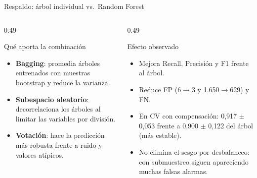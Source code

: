 \documentclass[aspectratio=169,11pt]{beamer}
\begin{document}
\begin{frame}{Respaldo: árbol individual vs.\ Random Forest}
  \scriptsize
  \setlength{\tabcolsep}{3pt}
  \renewcommand{\arraystretch}{1.15}
  \vspace{0.15cm}
  \begin{columns}[T]
    \begin{column}{0.49\textwidth}
      \begin{block}{Qué aporta la combinación}
        \scriptsize
        \begin{itemize}
          \item \textbf{Bagging}: promedia árboles entrenados con
                muestras bootstrap y reduce la varianza.
          \item \textbf{Subespacio aleatorio}: decorrelaciona los
                árboles al limitar las variables por división.
          \item \textbf{Votación}: hace la predicción más robusta
                frente a ruido y valores atípicos.
        \end{itemize}
      \end{block}
    \end{column}
    \begin{column}{0.49\textwidth}
      \begin{block}{Efecto observado}
        \scriptsize
        \begin{itemize}
          \item Mejora Recall, Precisión y F1 frente al árbol.
          \item Reduce FP (6\(\to\)3 y 1.650\(\to\)629) y FN.
          \item En CV con compensación: 0,917 \(\pm\) 0,053 frente a
                0,900 \(\pm\) 0,122 del árbol (más estable).
          \item No elimina el sesgo por desbalanceo: con submuestreo
                siguen apareciendo muchas falsas alarmas.
        \end{itemize}
      \end{block}
    \end{column}
  \end{columns}
\end{frame}
\end{document}
